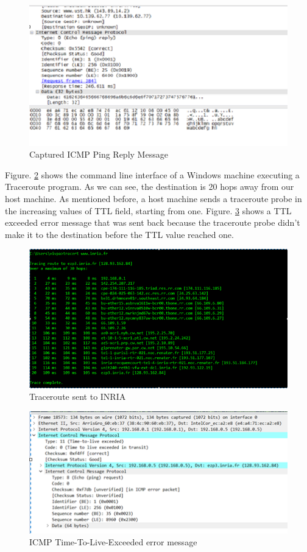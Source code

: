 \documentclass[10pt]{IEEEtran}
\begin{document}
\begin{appendix}
\begin{figure}[h!]
	\includegraphics[width=\linewidth]{PINGREPLY.PNG}
	\caption{Captured ICMP Ping Reply Message}
    \label{fig:pingreply}
\end{figure}

Figure. \ref{fig:cmdTrace} shows the command line interface of a Windows machine executing a Traceroute program. As we can see, the destination is 20 hops away from our host machine. As mentioned before, a host machine sends a traceroute probe in the increasing values of TTL field, starting from one. Figure. \ref{fig:icmperror} shows a TTL exceeded error message that was sent back because the traceroute probe didn't make it to the destination before the TTL value reached one. 

\begin{figure}[h!]
	\includegraphics[width=\linewidth]{tracert.png}
	\caption{Traceroute sent to INRIA}
    \label{fig:cmdTrace}
\end{figure}

\begin{figure}[h!]
	\includegraphics[width=\linewidth]{ICMPError.PNG}
	\caption{ICMP Time-To-Live-Exceeded error message}
    \label{fig:icmperror}
\end{figure}


\end{appendix}
\end{document}
